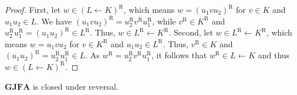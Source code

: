 \documentclass{ws-ijmpc}
\begin{document}
\begin{proof}
First, let $w\in\left(L\leftarrow K\right)^{\mathrm{R}}$, which means
$w=\left(u_{1}vu_{2}\right)^{\mathrm{R}}$ for $v\in K$ and $u_{1}u_{2}\in L$.
We have $\left(u_{1}vu_{2}\right)^{\mathrm{R}}=u_{2}^{\mathrm{R}}v^{\mathrm{R}}u_{1}^{\mathrm{R}}$,
while $v^{\mathrm{R}}\in K^{\mathrm{R}}$ and $u_{2}^{\mathrm{R}}u_{1}^{\mathrm{R}}=\left(u_{1}u_{2}\right)^{\mathrm{R}}\in L^{\mathrm{R}}$.
Thus, $w\in L^{\mathrm{R}}\leftarrow K^{\mathrm{R}}$. Second, let
$w\in L^{\mathrm{R}}\leftarrow K^{\mathrm{R}}$, which means $w=u_{1}vu_{2}$
for $v\in K^{\mathrm{R}}$ and $u_{1}u_{2}\in L^{\mathrm{R}}$. Thus,
$v^{\mathrm{R}}\in K$ and $\left(u_{1}u_{2}\right)^{\mathrm{R}}=u_{2}^{\mathrm{R}}u_{1}^{\mathrm{R}}\in L$.
As $w^{\mathrm{R}}=u_{2}^{\mathrm{R}}v^{\mathrm{R}}u_{1}^{\mathrm{R}}$,
it follows that $w^{\mathrm{R}}\in L\leftarrow K$ and thus $w\in\left(L\leftarrow K\right)^{\mathrm{R}}$. \end{proof}
\begin{theorem}
\label{thm:gjfa reversal}$\mathbf{GJFA}$ is closed under reversal.\end{theorem}
\end{document}
